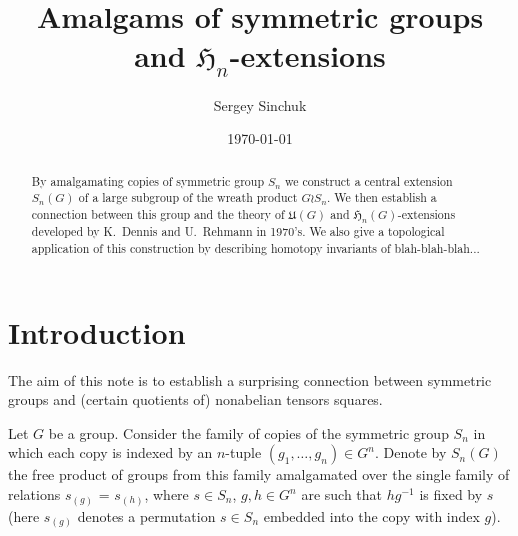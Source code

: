 \documentclass[oneside, 12pt]{amsart}
\title{Amalgams of symmetric groups and $\mathfrak{H}_n$-extensions}
\author {Sergey Sinchuk}
\date {\today}
\makeatletter
\theoremstyle{plain}
\numberwithin{equation}{section}
\numberwithin{lemma}{section}
\theoremstyle{remark}
\theoremstyle{definition}
\newcommand{\pullbackcorner}[1][dr]{\save*!/#1-1.2pc/#1:(-1,1)@^{|-}\restore}
\makeatother
\begin{document}
\begin{abstract} By amalgamating copies of symmetric group $S_n$ we construct a central extension $S_n(G)$ of a large subgroup of the wreath product $G \wr S_n$.
We then establish a connection between this group and the theory of $\mathfrak{U}(G)$ and $\mathfrak{H}_n(G)$-extensions developed by K.~Dennis and U.~Rehmann in 1970's.
We also give a topological application of this construction by describing homotopy invariants of blah-blah-blah...
\end{abstract}

\maketitle

\section{Introduction}
The aim of this note is to establish a surprising connection between symmetric groups and (certain quotients of) nonabelian tensors squares.

\begin{comment}
Denote by $D_n(G)$ the subgroup of $G^n$ consisting of vectors
 $(g_1,\ldots, g_n)$ for which the product $g_1\cdot \ldots \cdot g_n$ lies in the derived subgroup $[G, G]$.
Recall from Rehmann's paper~\cite{Reh78} that the universal {\it extension of type $\mathfrak{H}_n$} (denoted $H_n(G)$) 
 is, by definition, a certain (central) extension of $D_n(G)$ explicitly presented by generators and relations 
 (see section~\ref{sec:Hnextensions} below).
The extension $H_n(G)$ and its ''antisymmetrization`` $H^\wedge_n(G)$ can be characterised by the property that 
 they fit into the following pullback squares:
\[ \xymatrix{ G \mathbin{\widetilde{\wedge}} G \pullbackcorner \ar@{^{(}->}[d] \ar@{->>}[r] & [G, G] \ar@{^{(}->}[d]^{\iota_1} \\ H_n(G) \ar@{->>}[r] & D_n(G)} \qquad
   \xymatrix{ G \wedge G \pullbackcorner \ar@{^{(}->}[d] \ar@{->>}[r] & [G, G] \ar@{^{(}->}[d]^{\iota_1} \\ H^\wedge_n(G) \ar@{->>}[r] & D_n(G)} \]
Here $G \wedge G$ denotes the nonabelian exterior square of $G$ and  
 $G \mathbin{\widetilde{\wedge}} G$ is the modern notation for the Dennis group $(G, G)$ defined in~\cite{De76} (also denoted $U_G$ by Rehmann in \cite{Reh78}).
The map $\iota_1$ in the above diagrams is defined by $\iota_1(g) = (g, 1,\ldots, 1)$.
\end{comment}
Let $G$ be a group. Consider the family of copies of the symmetric group $S_n$ in which each copy is indexed by an $n$-tuple $(g_1, \ldots, g_n) \in G^n$.
Denote by $S_n(G)$ the free product of groups from this family amalgamated over the single family of relations
$s_{(g)}$ = $s_{(h)}$, where $s\in S_n$, $g, h \in G^n$ are such that $hg^{-1}$ is fixed by $s$
 (here $s_{(g)}$ denotes a permutation $s \in S_n$ embedded into the copy with index $g$).
\end{document}

